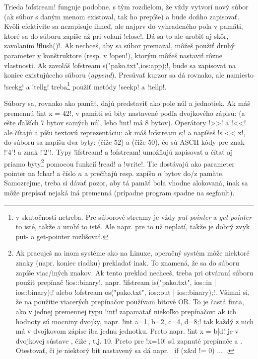 Trieda \prg!ofstream! funguje podobne, 
s tým rozdielom, že vždy vytvorí nový súbor (ak súbor s daným
menom existoval, tak ho prepíše) a bude doňho zapisovať. Kvôli efektivite sa nezapisuje ihneď,
ale najprv do vyhradeného poľa v pamäti, ktoré sa do súboru zapíše až pri volaní \prg!close!.
Dá sa to ale urobiť aj skôr, zavolaním \prg!flush()!. Ak nechceš, aby sa súbor premazal,
môžeš použiť druhý parameter v konštruktore (resp. v \prg!open!), ktorým môžeš nastaviť
rôzne vlastnosti. Ak zavoláš \prg!ofstream s("pako.txt",ios:app);!, bude sa zapisovať na
koniec existujúceho súboru ({\em append}). Presúvať kurzor sa dá rovnako, ale namiesto
\prg!seekg! a \prg!tellg! treba\footnote{v skutočnosti netreba. Pre súborové streamy je vždy {\em put-pointer}
a {\em get-pointer} to isté, takže  a  urobí to isté. Ale napr. pre  to už neplatí,
takže je dobrý zvyk put- a get-pointer rozlišovať.
} použiť metódy \prg!seekp! a \prg!tellp!.


Súbory sa, rovnako ako pamäť, dajú predstaviť ako pole núl a jednotiek. Ak máš premennú
\prg!int x = 42!, v pamäti sú bity nastavené podľa dvojkového zápisu:
 (a ešte ďalších 7 bytov samých núl, lebo \prg!int! má 8 bytov).
Operátory \prg!>>! a \prg!<<! ale čítajú a píšu textovú reprezentáciu: ak 
máš \prg!ofstream s;!
a napíšeš \prg!s << x!, do súboru sa napíšu dva byty:  (čiže $52$) a 
 (čiže $50$), čo sú ASCII kódy pre
znak \prg!'4'! a znak \prg!'2'!. Typy \prg!ifstream! a \prg!ofstream! umožňujú zapisovať 
a čítať aj priamo byty\footnote{%
  Ak pracuješ na inom systéme ako na Linuxe, operačný systém môže niektoré znaky (napr. 
  koniec riadku) prekladať inak. To znamená, že sa do súboru zapíše viac/iných znakov.
  Ak tento preklad nechceš, treba pri otváraní súboru použiť prepínač \prg!ios::binary!,
  napr. \prg!ifstream is("pako.txt", ios::in | ios::binary);! alebo
  \prg!ofstream os("pako.txt", ios::out | ios::binary);!. Všimni si, že na použitie
  viacerých prepínačov používam bitové OR. To je častá finta, ako v jednej premennej typu
  \prg!int! zapamätať niekoľko prepínačov: ak ich hodnoty sú mocniny dvojky, napr.
  \prg!int a=1, b=2, c=4, d=8;! tak každý z nich má v dvojkovom zápise iba jednu jednotku. 
  Preto napr. \prg!int x = b|d! je v dvojkovej sústave , čiže
  , t.j. $10$.  Preto pre \prg!x=10! sú zapnuté prepínače  a . 
  Otestovať, či je niektorý bit nastavený sa dá napr.
  \prg~if (x&d != 0) ...~.
  } pomocou funkcií \prg!read! a \prg!write!. Tie dostávajú ako parameter pointer na 
  \prg!char! a číslo $n$ a prečítajú resp. zapíšu $n$ bytov do/z pamäte. Samozrejme, 
  treba si dávať pozor, aby tá pamäť bola vhodne alokovaná, inak sa môže prepísať
  nejaká iná premenná (prípadne program spadne na segfault). 

